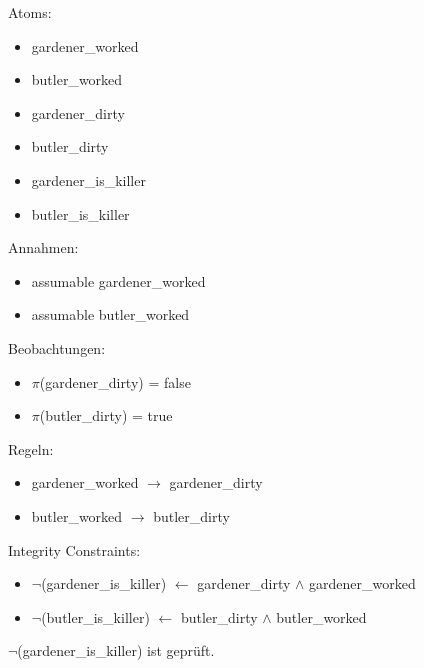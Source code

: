 \documentclass[ngerman]{fbi-aufgabenblatt}
\begin{document}

Atoms: 
\begin{itemize}
\item gardener\_worked
\item butler\_worked
\item gardener\_dirty
\item butler\_dirty
\item gardener\_is\_killer
\item butler\_is\_killer \\
\end{itemize}

Annahmen:
\begin{itemize}
\item assumable gardener\_worked
\item assumable butler\_worked \\
\end{itemize}

Beobachtungen:
\begin{itemize}
\item \(\pi\)(gardener\_dirty) = false
\item \(\pi\)(butler\_dirty) = true \\
\end{itemize}

Regeln:
\begin{itemize}
\item gardener\_worked \(\rightarrow\) gardener\_dirty
\item butler\_worked \(\rightarrow\) butler\_dirty \\
\end{itemize}

Integrity Constraints:
\begin{itemize}
\item \(\neg\)(gardener\_is\_killer) \(\leftarrow\) gardener\_dirty \(\land\) gardener\_worked
\item \(\neg\)(butler\_is\_killer) \(\leftarrow\) butler\_dirty \(\land\) butler\_worked
\end{itemize}

\(\neg\)(gardener\_is\_killer) ist geprüft.

\newpage

\end{document}

